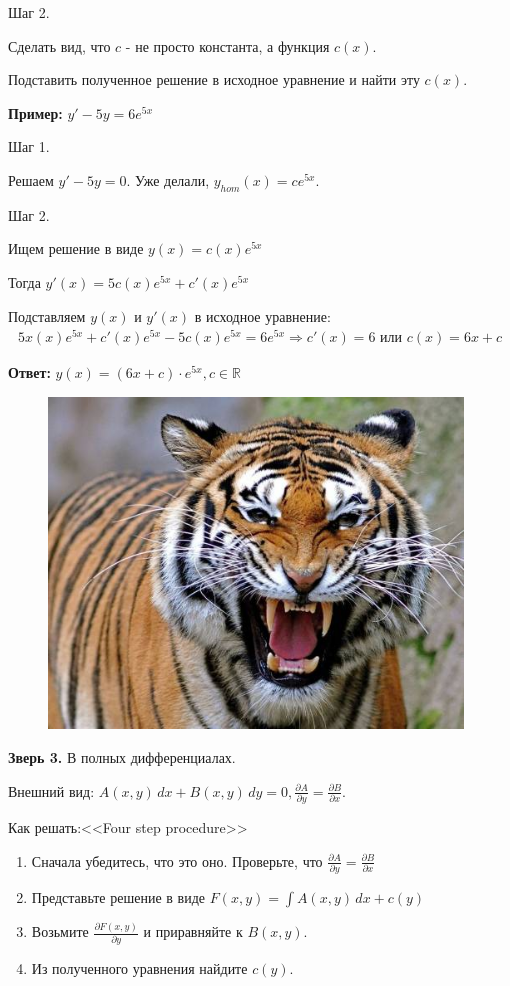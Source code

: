 \documentclass[10pt,a4paper]{article}
\begin{document}
\par Шаг 2.
\par Сделать вид, что $c$ - не просто константа, а функция $c(x)$.
\par Подставить полученное решение в исходное уравнение и найти эту $c(x)$.
\par \textbf{Пример:} $y' - 5y = 6e^{5x}$
\par Шаг 1.
\par Решаем $y' - 5y = 0$. Уже делали, $y_{hom}(x) = ce^{5x}$.
\par Шаг 2.
\par Ищем решение в виде $y(x) = c(x) e^{5x}$
\par Тогда $y'(x) = 5c(x) e^{5x} + c'(x)e^{5x}$
\par Подставляем $y(x)$ и $y'(x)$ в исходное уравнение:
\begin{eqnarray*}
5x(x) e^{5x} + c'(x) e^{5x} - 5c(x)e^{5x} = 6e^{5x} \Rightarrow c'(x) = 6 \text{ или } c(x) = 6x + c
\end{eqnarray*}
\par \textbf{Ответ:} $y(x) = (6x + c) \cdot e^{5x}, c \in \mathbb{R}$ \\
\newpage{}
\pagecolor{magenta}
\begin{figure}[h]
\centering
\includegraphics[width=11cm]{tiger.jpg}
\end{figure}
\par \textbf{Зверь 3.} В полных дифференциалах.
\par Внешний вид: $A(x, y) \, dx + B(x,y) \, dy = 0, \frac{\partial{A}}{\partial{y}} = \frac{\partial{B}}{\partial{x}}$.
\par Как решать:<<Four step procedure>>
\begin{enumerate}
\item Сначала убедитесь, что это оно. Проверьте, что $\frac{\partial{A}}{\partial{y}} = \frac{\partial{B}}{\partial{x}}$
\item Представьте решение в виде $F(x,y) = \int A(x,y) \, dx + c(y)$
\item Возьмите $\frac{\partial{F(x,y)}}{\partial{y}}$ и приравняйте к $B(x,y)$.
\item Из полученного уравнения найдите $c(y)$.
\end{enumerate}
\end{document}
